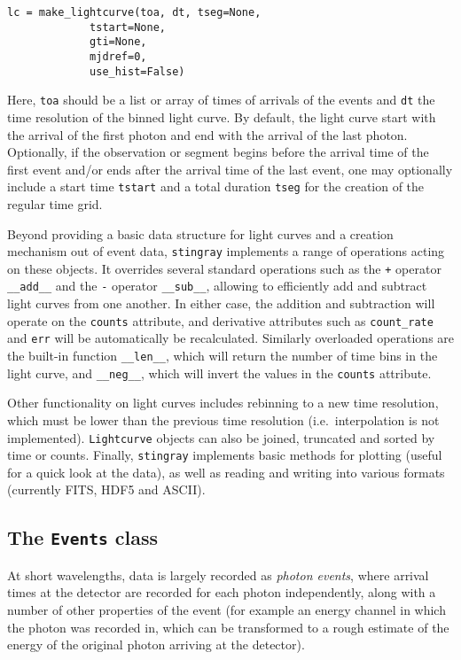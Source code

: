 \documentclass[12pt]{emulateapj}
\newcommand{\stingray}{\texttt{stingray}\xspace}
\newcommand{\lightcurve}{\texttt{Lightcurve}\xspace}
\begin{document}
\begin{verbatim}
lc = make_lightcurve(toa, dt, tseg=None, 
		     tstart=None, 
		     gti=None,
		     mjdref=0,
		     use_hist=False)
\end{verbatim}

Here, \texttt{toa} should be a list or array of times of arrivals of the events and \texttt{dt} the time resolution of the binned light curve. By default, the light curve start with the arrival of the first photon and end with the arrival of the last photon. Optionally, if the observation or segment begins before the arrival time of the first event and/or ends after the arrival time of the last event, one may optionally include a start time \texttt{tstart} and a total duration \texttt{tseg} for the creation of the regular time grid. 

Beyond providing a basic data structure for light curves and a creation mechanism out of event data, \stingray implements a range of operations acting on these objects. It overrides several standard operations such as the \texttt{+} operator \verb|__add__| and the \texttt{-} operator \verb|__sub__|, allowing to efficiently add and subtract light curves from one another. In either case, the addition and subtraction will operate on the \texttt{counts} attribute, and derivative attributes such as \verb|count_rate| and \texttt{err} will be automatically be recalculated. Similarly overloaded operations are the built-in function \verb|__len__|, which will return the number of time bins in the light curve, and \verb|__neg__|, which will invert the values in the \texttt{counts} attribute.

Other functionality on light curves includes rebinning to a new time resolution, which must be lower than the previous time resolution (i.e.\ interpolation is not implemented). 
\lightcurve objects can also be joined, truncated and sorted by time or counts. Finally, \stingray implements basic methods for plotting (useful for a quick look at the data), as well as reading and writing into various formats (currently FITS, HDF5 and ASCII).

\subsection{The \texttt{Events} class}

At short wavelengths, data is largely recorded as \textit{photon events}, where arrival times at the detector are recorded for each photon independently, along with a number of other properties of the event (for example an energy channel in which the photon was recorded in, which can be transformed to a rough estimate of the energy of the original photon arriving at the detector).
\end{document}
